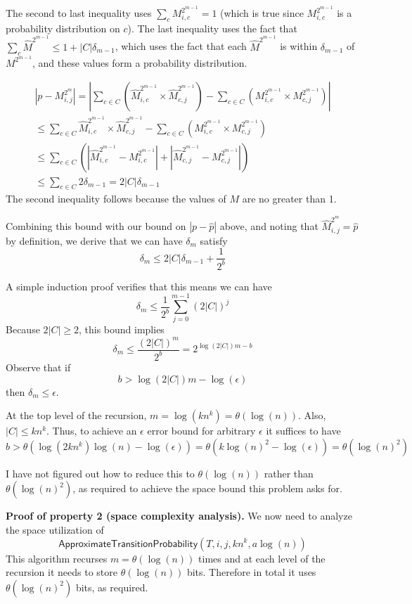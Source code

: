 \documentclass{article}
\begin{document}
The second to last inequality uses $\sum_c {M^{2^{m-1}}_{i, c}} = 1$ (which is true since $M^{2^{m-1}}_{i, c}$ is a probability distribution on $c$).
The last inequality uses the fact that $\sum_c \hat{M}^{2^{m-1}} \leq 1 + |C|\delta_{m-1}$, which uses the fact that each $\hat{M}^{2^{m-1}}$ is within $\delta_{m-1}$ of $M^{2^{m-1}}$, and these values form a probability distribution.


\newpage
\begin{multline*}
	|p - M_{i, j}^{2^m}| = |\sum_{c \in C}{(\hat{M}_{i, c}^{2^{m-1}} \times \hat{M}_{c, j}^{2^{m-1}})} - \sum_{c \in C}{(M_{i, c}^{2^{m-1}} \times M_{c, j}^{2^{m-1}})}|
	\\
	\leq \sum_{c \in C}{
		\hat{M}_{i, c}^{2^{m-1}} \times \hat{M}_{c, j}^{2^{m-1}} -
		\sum_{c \in C}{(M_{i, c}^{2^{m-1}} \times M_{c, j}^{2^{m-1}})}
	} \\
	\leq \sum_{c \in C}{(|\hat{M}_{i, c}^{2^{m-1}} - M_{i, c}^{2^{m-1}}| + |\hat{M}_{c, j}^{2^{m-1}} - M_{c, j}^{2^{m-1}}|)} \\
	\leq \sum_{c \in C} 2\delta_{m-1} = 2|C|\delta_{m-1}
\end{multline*}
The second inequality follows because the values of $M$ are no greater than 1.

Combining this bound with our bound on $|p - \hat{p}|$ above, and noting that $\hat{M}_{i, j}^{2^m} = \hat{p}$ by definition, we derive that we can have $\delta_m$ satisfy
$$
\delta_m \leq 2|C|\delta_{m-1} + \frac{1}{2^b}
$$

A simple induction proof verifies that this means we can have
$$
\delta_m \leq \frac{1}{2^b} \sum_{j=0}^{m-1}(2 |C|)^j
$$
Because $2|C| \geq 2$, this bound implies
$$
\delta_m \leq \frac{(2|C|)^m}{2^b} = 2^{
	\log(2|C|)m - b
}
$$
Observe that if
$$
b > \log(2|C|)m - \log(\epsilon)
$$
then $\delta_m \leq \epsilon$.

At the top level of the recursion, $m = \log(k n^k) = \theta(\log(n))$.
Also, $|C| \leq kn^k$.
Thus, to achieve an $\epsilon$ error bound for arbitrary $\epsilon$ it suffices to have
$$
b > \theta(\log(2kn^k)\log(n) - \log(\epsilon)) = \theta(k\log(n)^2 - \log(\epsilon)) = \theta(\log(n)^2)
$$

I have not figured out how to reduce this to $\theta(\log(n))$ rather than $\theta(\log(n)^2)$, as required to achieve the space bound this problem asks for.

\medskip
\noindent \textbf{Proof of property 2 (space complexity analysis).}
We now need to analyze the space utilization of $$\mathsf{ApproximateTransitionProbability}(T, i, j, kn^k, a \log(n))$$
This algorithm recurses $m = \theta(\log(n))$ times and at each level of the recursion it needs to store $\theta(\log(n))$ bits.
Therefore in total it uses $\theta(\log(n)^2)$ bits, as required.
\end{document}
